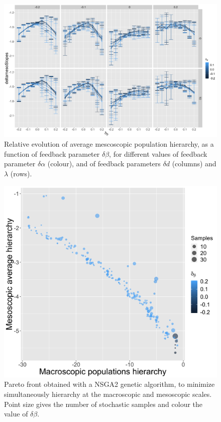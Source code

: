 \documentclass[11pt]{article}
\begin{document}
\begin{figure}[h!]
	\includegraphics[width=\textwidth]{deltamesoSlopes-macroMesoAlphaUpdateMax_colormacroMesoBetaUpdateMax_facetmesoMacroCongestionCost-mesoMacroDecayUpdateMax_mesoBeta0_11.png}
	\caption{Relative evolution of average mescoscopic population hierarchy, as a function of feedback parameter $\delta \beta$, for different values of feedback parameter $\delta \alpha$ (colour), and of feedback parameters $\delta d$ (columns) and $\lambda$ (rows).\label{fig:fig6}}
\end{figure}

\begin{figure}[h!]
	\begin{center}
	\includegraphics[width=0.6\linewidth]{pareto_macroHierarchy-mesoHierarchy.png}
	\end{center}
	\caption{Pareto front obtained with a NSGA2 genetic algorithm, to minimize simultaneously hierarchy at the macroscopic and mesoscopic scales. Point size gives the number of stochastic samples and colour the value of $\delta \beta$.\label{fig:fig7}}
\end{figure}
\end{document}
